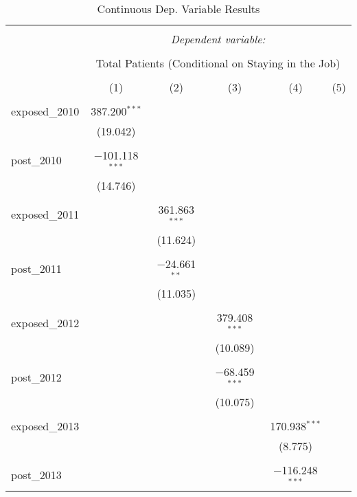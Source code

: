 
\begin{table}[!htbp] \centering 
  \caption{Continuous Dep. Variable Results} 
  \label{} 
  \begin{adjustbox}{width=\textwidth}
\begin{tabular}{@{\extracolsep{5pt}}lccccc} 
\\[-1.8ex]\hline 
\hline \\[-1.8ex] 
 & \multicolumn{5}{c}{\textit{Dependent variable:}} \\ 
\cline{2-6} 
\\[-1.8ex] & \multicolumn{5}{c}{Total Patients (Conditional on Staying in the Job)} \\ 
\\[-1.8ex] & (1) & (2) & (3) & (4) & (5)\\ 
\hline \\[-1.8ex] 
 exposed\_2010 & 387.200$^{***}$ &  &  &  &  \\ 
  & (19.042) &  &  &  &  \\ 
  & & & & & \\ 
 post\_2010 & $-$101.118$^{***}$ &  &  &  &  \\ 
  & (14.746) &  &  &  &  \\ 
  & & & & & \\ 
 exposed\_2011 &  & 361.863$^{***}$ &  &  &  \\ 
  &  & (11.624) &  &  &  \\ 
  & & & & & \\ 
 post\_2011 &  & $-$24.661$^{**}$ &  &  &  \\ 
  &  & (11.035) &  &  &  \\ 
  & & & & & \\ 
 exposed\_2012 &  &  & 379.408$^{***}$ &  &  \\ 
  &  &  & (10.089) &  &  \\ 
  & & & & & \\ 
 post\_2012 &  &  & $-$68.459$^{***}$ &  &  \\ 
  &  &  & (10.075) &  &  \\ 
  & & & & & \\ 
 exposed\_2013 &  &  &  & 170.938$^{***}$ &  \\ 
  &  &  &  & (8.775) &  \\ 
  & & & & & \\ 
 post\_2013 &  &  &  & $-$116.248$^{***}$ &  \\ 

\end{tabular}
\end{adjustbox}
\end{table}
